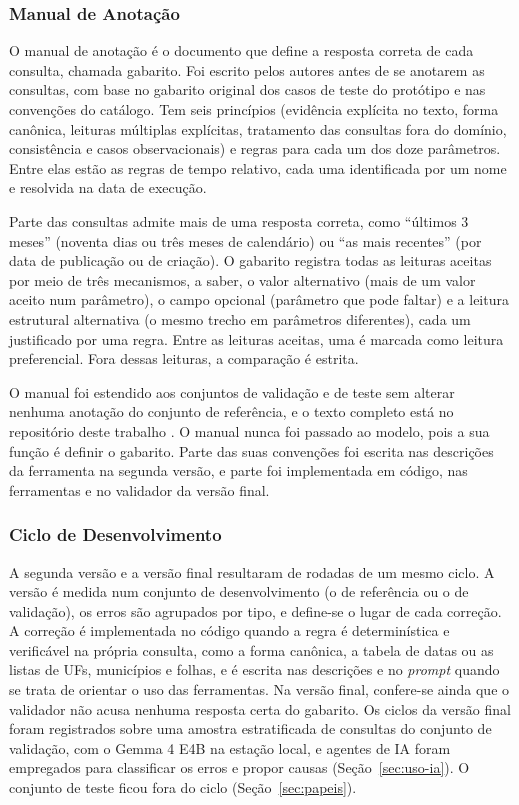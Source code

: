\subsubsection{Manual de Anotação}
\label{sec:manual}

O manual de anotação é o documento que define a resposta correta de cada consulta, chamada gabarito. Foi escrito pelos autores antes de se anotarem as consultas, com base no gabarito original dos casos de teste do protótipo e nas convenções do catálogo. Tem seis princípios (evidência explícita no texto, forma canônica, leituras múltiplas explícitas, tratamento das consultas fora do domínio, consistência e casos observacionais) e regras para cada um dos doze parâmetros. Entre elas estão as regras de tempo relativo, cada uma identificada por um nome e resolvida na data de execução.

Parte das consultas admite mais de uma resposta correta, como ``últimos 3 meses'' (noventa dias ou três meses de calendário) ou ``as mais recentes'' (por data de publicação ou de criação). O gabarito registra todas as leituras aceitas por meio de três mecanismos, a saber, o valor alternativo (mais de um valor aceito num parâmetro), o campo opcional (parâmetro que pode faltar) e a leitura estrutural alternativa (o mesmo trecho em parâmetros diferentes), cada um justificado por uma regra. Entre as leituras aceitas, uma é marcada como leitura preferencial. Fora dessas leituras, a comparação é estrita.

O manual foi estendido aos conjuntos de validação e de teste sem alterar nenhuma anotação do conjunto de referência, e o texto completo está no repositório deste trabalho \cite{correa2026pfcbusca}. O manual nunca foi passado ao modelo, pois a sua função é definir o gabarito. Parte das suas convenções foi escrita nas descrições da ferramenta na segunda versão, e parte foi implementada em código, nas ferramentas e no validador da versão final.

\subsubsection{Ciclo de Desenvolvimento}
\label{sec:ciclo}

A segunda versão e a versão final resultaram de rodadas de um mesmo ciclo. A versão é medida num conjunto de desenvolvimento (o de referência ou o de validação), os erros são agrupados por tipo, e define-se o lugar de cada correção. A correção é implementada no código quando a regra é determinística e verificável na própria consulta, como a forma canônica, a tabela de datas ou as listas de UFs, municípios e folhas, e é escrita nas descrições e no \textit{prompt} quando se trata de orientar o uso das ferramentas. Na versão final, confere-se ainda que o validador não acusa nenhuma resposta certa do gabarito. Os ciclos da versão final foram registrados sobre uma amostra estratificada de  consultas do conjunto de validação, com o Gemma 4 E4B na estação local, e agentes de IA foram empregados para classificar os erros e propor causas (Seção~\ref{sec:uso-ia}). O conjunto de teste ficou fora do ciclo (Seção~\ref{sec:papeis}).

